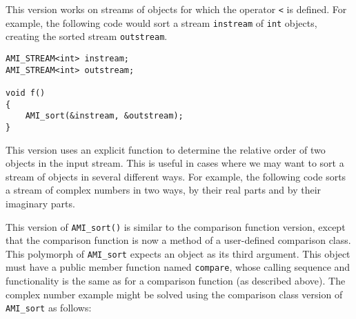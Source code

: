  This version works on streams of
objects for which the operator \lstinline|<| is defined. For
example, the following code would sort a stream
\lstinline|instream| of \lstinline|int| objects, creating the sorted
stream \lstinline|outstream|.

\begin{lstlisting}
AMI_STREAM<int> instream;
AMI_STREAM<int> outstream;

void f()
{
    AMI_sort(&instream, &outstream);
}
\end{lstlisting}

This version uses an explicit function to
determine the relative order of two objects in the input stream.  This
is useful in cases where we may want to sort a stream of objects in
several different ways.  For example, the following code sorts a
stream of complex numbers in two ways, by their real parts and by
their imaginary parts.



This version of \lstinline|AMI_sort()| is similar to the comparison
function version, except that the comparison function is now a method
of a user-defined comparison class. This polymorph of
\lstinline|AMI_sort| expects an object as its third argument. This
object must have a public member function named \lstinline|compare|,
whose calling sequence and functionality is the same as for a
comparison function (as described above). The complex number example
might be solved using the comparison class version of
\lstinline|AMI_sort| as follows: 





